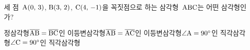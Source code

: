 세 점~$\mathrm{A}(0,\,3)$, $\mathrm{B}(3,\,2)$, $\mathrm{C}(4,\,-1)$을 꼭짓점으로 하는 삼각형~$\mathrm{ABC}$는 어떤 삼각형인가?
\begin{choicesv}{정삼각형}{$\overline{\mathrm{AB}}=\overline{\mathrm{BC}}$인 이등변삼각형}{$\overline{\mathrm{AB}}=\overline{\mathrm{AC}}$인 이등변삼각형}{$\angle\mathrm{A}=90^\circ$인 직각삼각형}{$\angle\mathrm{C}=90^\circ$인 직각삼각형}\end{choicesv}
